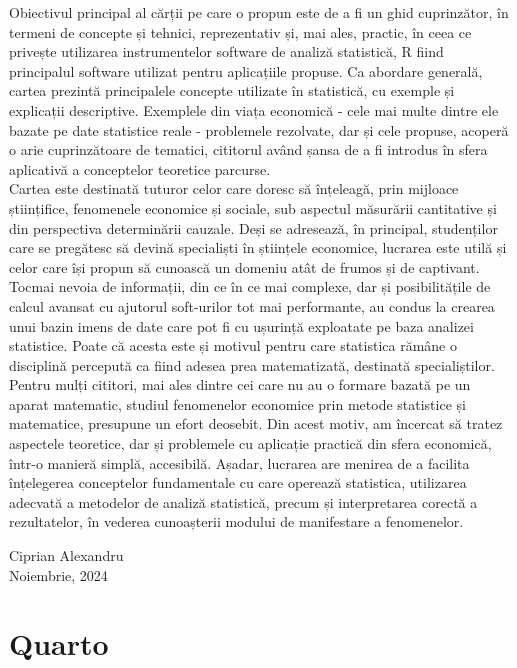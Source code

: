 \documentclass[
  11pt,
  b5paper,
  nottoc]{book}
\begin{document}
Obiectivul principal al cărții pe care o propun este de a fi un ghid
cuprinzător, în termeni de concepte și tehnici, reprezentativ și, mai
ales, practic, în ceea ce privește utilizarea instrumentelor software de
analiză statistică, R fiind principalul software utilizat pentru
aplicațiile propuse. Ca abordare generală, cartea prezintă principalele
concepte utilizate în statistică, cu exemple și explicații descriptive.
Exemplele din viața economică - cele mai multe dintre ele bazate pe date
statistice reale - problemele rezolvate, dar și cele propuse, acoperă o
arie cuprinzătoare de tematici, cititorul având șansa de a fi introdus
în sfera aplicativă a conceptelor teoretice parcurse.\\
Cartea este destinată tuturor celor care doresc să înțeleagă, prin
mijloace științifice, fenomenele economice și sociale, sub aspectul
măsurării cantitative și din perspectiva determinării cauzale. Deși se
adresează, în principal, studenților care se pregătesc să devină
specialiști în științele economice, lucrarea este utilă și celor care
își propun să cunoască un domeniu atât de frumos și de captivant. Tocmai
nevoia de informații, din ce în ce mai complexe, dar și posibilitățile
de calcul avansat cu ajutorul soft-urilor tot mai performante, au condus
la crearea unui bazin imens de date care pot fi cu ușurință exploatate
pe baza analizei statistice. Poate că acesta este și motivul pentru care
statistica rămâne o disciplină percepută ca fiind adesea prea
matematizată, destinată specialiștilor. Pentru mulți cititori, mai ales
dintre cei care nu au o formare bazată pe un aparat matematic, studiul
fenomenelor economice prin metode statistice și matematice, presupune un
efort deosebit. Din acest motiv, am încercat să tratez aspectele
teoretice, dar și problemele cu aplicație practică din sfera economică,
într-o manieră simplă, accesibilă. Așadar, lucrarea are menirea de a
facilita înțelegerea conceptelor fundamentale cu care operează
statistica, utilizarea adecvată a metodelor de analiză statistică,
precum și interpretarea corectă a rezultatelor, în vederea cunoașterii
modului de manifestare a fenomenelor.

\begin{flushright}
Ciprian Alexandru \\
Noiembrie, 2024
\end{flushright}

\newpage

\section*{Quarto}\label{quarto}
\end{document}

